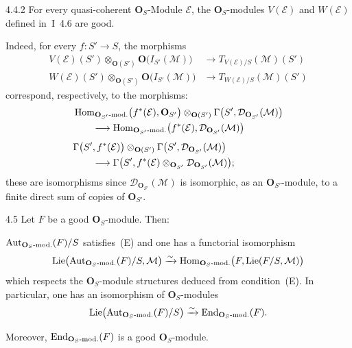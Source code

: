 \begin{examples}{4.4.2}\label{II.4.4.2}
For every quasi-coherent \(\mathbf{O}_{S}\)-Module \(\mathcal{E}\), the
\(\mathbf{O}_{S}\)-modules \(V(\mathcal{E})\) and \(W(\mathcal{E})\) defined
in~I~4.6 are good.
\end{examples}

{\renewcommand{\thefootnote}{(70)}}
Indeed, for every \(f\colon S'\to S\), the morphisms
\begin{align*}
V(\mathcal{E})(S')\otimes_{\mathbf{O}(S')}\mathbf{O}\bigl(I_{S'}(\mathcal{M})\bigr)
&\longrightarrow
T_{V(\mathcal{E})/S}(\mathcal{M})(S')\\
W(\mathcal{E})(S')\otimes_{\mathbf{O}(S')}\mathbf{O}\bigl(I_{S'}(\mathcal{M})\bigr)
&\longrightarrow
T_{W(\mathcal{E})/S}(\mathcal{M})(S')
\end{align*}
correspond, respectively, to the morphisms:
\begin{align*}
&\operatorname{Hom}_{\mathbf{O}_{S'}\text{-mod.}}\bigl(f^{*}(\mathcal{E}),\mathbf{O}_{S'}\bigr)
\otimes_{\mathbf{O}(S')}
\Gamma\bigl(S',\mathcal{D}_{\mathbf{O}_{S'}}(\mathcal{M})\bigr)\\
&\qquad\longrightarrow
\operatorname{Hom}_{\mathbf{O}_{S'}\text{-mod.}}\bigl(f^{*}(\mathcal{E}),
  \mathcal{D}_{\mathbf{O}_{S'}}(\mathcal{M})\bigr)\\[0.4em]
&\Gamma\bigl(S',f^{*}(\mathcal{E})\bigr)
\otimes_{\mathbf{O}(S')}
\Gamma\bigl(S',\mathcal{D}_{\mathbf{O}_{S'}}(\mathcal{M})\bigr)\\
&\qquad\longrightarrow
\Gamma\bigl(S',f^{*}(\mathcal{E})
  \otimes_{\mathbf{O}_{S'}}\mathcal{D}_{\mathbf{O}_{S'}}(\mathcal{M})\bigr);
\end{align*}
these are isomorphisms since \(\mathcal{D}_{\mathbf{O}_{S'}}(\mathcal{M})\)
is isomorphic, as an \(\mathbf{O}_{S'}\)-module, to a finite direct sum of
copies of \(\mathbf{O}_{S'}\).

\begin{proposition}{4.5}\label{II.4.5}
Let \(F\) be a good \(\mathbf{O}_{S}\)-module. Then:
\begin{enumeratei}
\item \(\operatorname{Aut}_{\mathbf{O}_{S}\text{-mod.}}(F)/S\) satisfies~(E) and one has a
functorial isomorphism
\[
\operatorname{Lie}\bigl(\operatorname{Aut}_{\mathbf{O}_{S}\text{-mod.}}(F)/S,\mathcal{M}\bigr)
\xrightarrow{\sim}
\operatorname{Hom}_{\mathbf{O}_{S}\text{-mod.}}\bigl(F,\operatorname{Lie}(F/S,\mathcal{M})\bigr)
\]
which respects the \(\mathbf{O}_{S}\)-module structures deduced from
condition~(E). In particular, one has an isomorphism of
\(\mathbf{O}_{S}\)-modules
\[
\operatorname{Lie}\bigl(\operatorname{Aut}_{\mathbf{O}_{S}\text{-mod.}}(F)/S\bigr)
\xrightarrow{\sim}
\operatorname{End}_{\mathbf{O}_{S}\text{-mod.}}(F).
\]
\item {\renewcommand{\thefootnote}{(71)}}
Moreover, \(\operatorname{End}_{\mathbf{O}_{S}\text{-mod.}}(F)\) is a good
\(\mathbf{O}_{S}\)-module.
\end{enumeratei}
\end{proposition}

